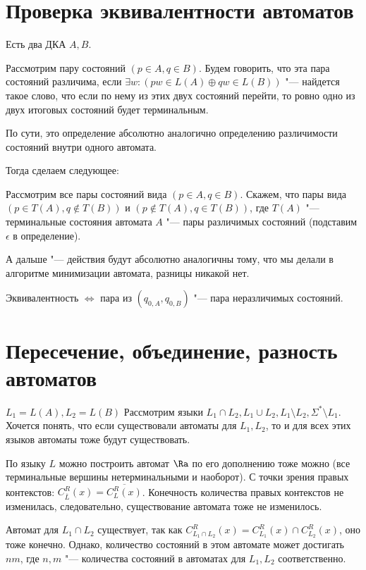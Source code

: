 \section{Проверка эквивалентности автоматов}

\begin{Def}
Есть два ДКА $A, B$.

Рассмотрим пару состояний $(p \in A, q \in B)$. 
Будем говорить, что эта пара состояний различима, если $\exists w: (pw \in L(A) \oplus qw \in L(B))$ "---
найдется такое слово, что если по нему из этих двух состояний перейти, то ровно одно из двух итоговых состояний будет терминальным.
\end{Def}
\begin{Rem}
По сути, это определение абсолютно аналогично определению различимости состояний внутри одного автомата.
\end{Rem}

Тогда сделаем следующее:

Рассмотрим все пары состояний вида $(p \in A, q \in B)$.
Скажем, что пары вида $(p \in T(A), q \notin T(B))$ и $(p \notin T(A), q \in T(B))$, где $T(A)$ "--- терминальные состояния автомата $A$ "--- пары различимых состояний (подставим $\epsilon$ в определение).

А дальше "--- действия будут абсолютно аналогичны тому, что мы делали в алгоритме минимизации автомата, разницы никакой нет.

Эквивалентность $\iff$ пара из $(q_{0, A}, q_{0, B})$ "--- пара неразличимых состояний.

\section{Пересечение, объединение, разность автоматов}
$L_1 = L(A), L_2 = L(B)$
Рассмотрим языки $L_1 \cap L_2, L_1 \cup L_2, L_1 \setminus L_2, \Sigma^* \setminus L_1$. 
Хочется понять, что если существовали автоматы для $L_1, L_2$, то и для всех этих языков автоматы тоже будут существовать. 

По языку $L$ можно построить автомат $\Ra$ по его дополнению тоже можно (все терминальные вершины нетерминальными и наоборот).
С точки зрения правых контекстов: $C_{\overline{L}}^R(x) = \overline{C_L^R(x)}$. Конечность количества правых контекстов не изменилась, следовательно, существование автомата тоже не изменилось.

Автомат для $L_1 \cap L_2$ существует, так как $C_{L_1 \cap L_2}^R(x) = C_{L_1}^R(x) \cap C_{L_2}^R(x)$, оно тоже конечно. 
Однако, количество состояний в этом автомате может достигать $nm$, где $n, m$ "--- количества состояний в автоматах для $L_1, L_2$ соответственно.

